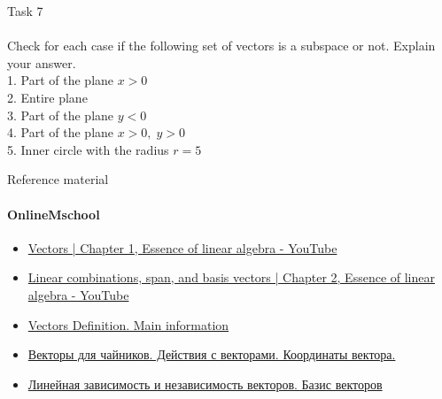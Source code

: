 \documentclass[aspectratio=169,notes]{beamer}
\newcommand{\fbckg}[1]{\usebackgroundtemplate{\texttt{[image: \#1]}}}%
\begin{document}
\begin{frame}[t]{Task 7}
    \framesubtitle{}
    Check for each case if the following set of vectors is a subspace or not. Explain your answer. \\
    1. Part of the plane $x > 0$ \\
    2. Entire plane \\
    3. Part of the plane $y < 0$ \\
    4. Part of the plane $x > 0, \; y > 0$  \\
    5. Inner circle with the radius $r = 5$ \\
\end{frame}

\begin{frame}[t]{Reference material}
    \framesubtitle{OnlineMschool}
    \begin{itemize}
        \item \href{https://youtu.be/fNk_zzaMoSs}{Vectors | Chapter 1, Essence of linear algebra - YouTube}
        \item \href{https://youtu.be/k7RM-ot2NWY}{Linear combinations, span, and basis vectors | Chapter 2, Essence of linear algebra - YouTube}
        \item \href{https://onlinemschool.com/math/library/vector/vector-definition/}{Vectors Definition. Main information}
        \item \href{http://www.mathprofi.ru/vektory_dlya_chainikov.html}{Векторы для чайников. Действия с векторами. Координаты вектора.}
        \item \href{http://www.mathprofi.ru/linejnaja_nezavisimost_vektorov_bazis_vektorov.html}{Линейная зависимость и независимость векторов. Базис векторов}
    \end{itemize}
\end{frame}

\fbckg{fibeamer/figs/last_page.png}
\frame[plain]{}
\end{document}
